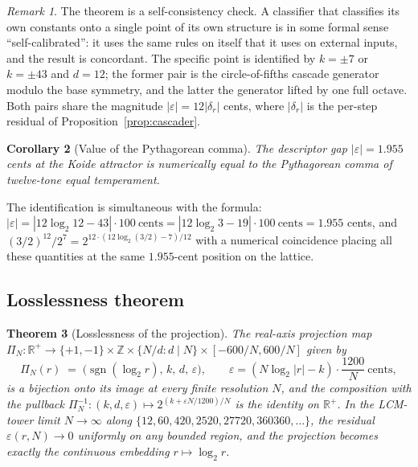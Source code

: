 \documentclass[11pt,a4paper]{article}
\newtheorem{theorem}{Theorem}[section]
\newtheorem{corollary}[theorem]{Corollary}
\theoremstyle{definition}
\theoremstyle{remark}
\newtheorem{remark}[theorem]{Remark}
\newcommand{\R}{\mathbb{R}}
\newcommand{\Z}{\mathbb{Z}}
\newcommand{\eps}{\varepsilon}
\begin{document}
\begin{remark}
The theorem is a self-consistency check. A classifier that classifies its own constants onto a single point of its own structure is in some formal sense ``self-calibrated'': it uses the same rules on itself that it uses on external inputs, and the result is concordant. The specific point is identified by $k=\pm 7$ or $k=\pm 43$ and $d=12$; the former pair is the circle-of-fifths cascade generator modulo the base symmetry, and the latter the generator lifted by one full octave. Both pairs share the magnitude $|\eps| = 12|\delta_{r}|$ cents, where $|\delta_{r}|$ is the per-step residual of Proposition~\ref{prop:cascader}.
\end{remark}

\begin{corollary}[Value of the Pythagorean comma]\label{cor:comma}
The descriptor gap $|\eps|=1.955$ cents at the Koide attractor is numerically equal to the Pythagorean comma of twelve-tone equal temperament.
\end{corollary}

The identification is simultaneous with the formula: $|\eps| = |12\log_{2}12 - 43| \cdot 100\ \text{cents} = |12\log_{2}3 - 19|\cdot 100\ \text{cents} = 1.955$ cents, and $(3/2)^{12}/2^{7} = 2^{12\cdot(12\log_{2}(3/2)-7)/12}$ with a numerical coincidence placing all these quantities at the same $1.955$-cent position on the lattice.

\subsection{Losslessness theorem}

\begin{theorem}[Losslessness of the projection]\label{thm:lossless}
The real-axis projection map $\Pi_{N}: \R^{+} \to \{+1,-1\}\times\Z\times\{N/d : d\mid N\}\times[-600/N, 600/N]$ given by
\[
\Pi_{N}(r) \;=\; \bigl(\operatorname{sgn}(\log_{2} r),\, k,\, d,\, \varepsilon\bigr), \qquad \varepsilon = (N\log_{2}|r| - k)\cdot\frac{1200}{N}\ \text{cents},
\]
is a bijection onto its image at every finite resolution $N$, and the composition with the pullback $\Pi_{N}^{-1}:(k,d,\varepsilon)\mapsto 2^{(k + \varepsilon N / 1200)/N}$ is the identity on $\R^{+}$. In the LCM-tower limit $N\to\infty$ along $\{12, 60, 420, 2520, 27720, 360360, \ldots\}$, the residual $\varepsilon(r,N)\to 0$ uniformly on any bounded region, and the projection becomes exactly the continuous embedding $r \mapsto \log_{2}r$.
\end{theorem}
\end{document}
